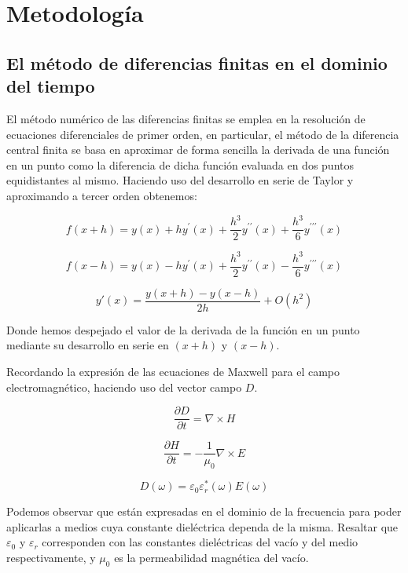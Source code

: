 \documentclass[11pt,a4paper,twoside,pdf]{article}
\numberwithin{equation}{section}
\begin{document}
\section{Metodología}
\subsection{El método de diferencias finitas en el dominio del tiempo} \label{section:metodo_diferencias_finitas}
El método numérico de las diferencias finitas se emplea en la resolución de ecuaciones diferenciales de primer orden, en particular, el método de la diferencia central finita se basa en aproximar de forma sencilla la derivada de una función en un punto como la diferencia de dicha función evaluada en dos puntos equidistantes al mismo. Haciendo uso del desarrollo en serie de Taylor y aproximando a tercer orden obtenemos:

\begin{equation}
f(x+h)=y(x)+hy^\prime(x)+\frac{h^3}{2}y^{\prime\prime}(x)+\frac{h^3}{6}y^{\prime\prime\prime}(x)
\end{equation}

\begin{equation}
f(x-h)=y(x)-hy^\prime(x)+\frac{h^3}{2}y^{\prime\prime}(x)-\frac{h^3}{6}y^{\prime\prime\prime}(x)
\end{equation}

\begin{equation}
y\prime(x)=\frac{y(x+h)-y(x-h)}{2h}+O(h^2)
\end{equation}

Donde hemos despejado el valor de la derivada de la función en un punto mediante su desarrollo en serie en $(x+h)$ y $(x-h)$.

Recordando la expresión de las ecuaciones de Maxwell para el campo electromagnético, haciendo uso del vector campo $D$.

\begin{equation}
\frac{\partial D}{\partial t}=\nabla \times H
\end{equation}

\begin{equation}
\frac{\partial H}{\partial t}=-\frac{1}{\mu_{0}}\nabla \times E
\end{equation}

\begin{equation}
D(\omega)=\varepsilon_{0}\varepsilon^*_{r}(\omega)E(\omega)
\end{equation}

Podemos observar que están expresadas en el dominio de la frecuencia para poder aplicarlas a medios cuya constante dieléctrica dependa de la misma. Resaltar que $\varepsilon_{0}$ y $\varepsilon_{r}$ corresponden con las constantes dieléctricas del vacío y del medio respectivamente, y $\mu_{0}$ es la permeabilidad magnética del vacío.
\end{document}
